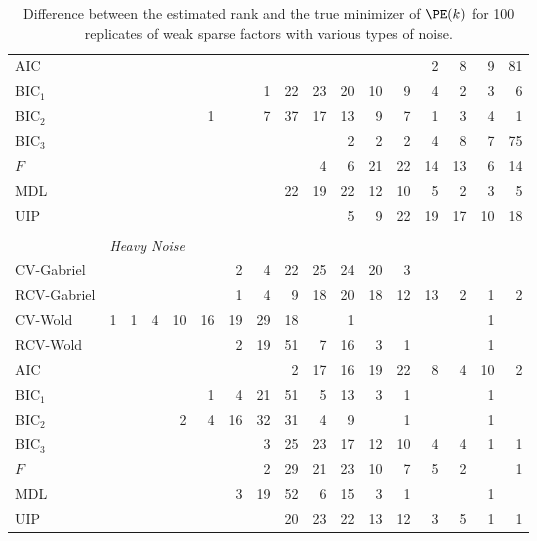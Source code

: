 \begin{table}
\begin{tabular}{lrrrrrrrrrrrrrrrr}
 AIC &  &  &  &  &  &  &  &  &  &  &  &  &  2 &  8 &  9 &  81\\ 
 BIC$_1$ &  &  &  &  &  &  &  1 &  22 &  23 &  20 &  10 &  9 &  4 &  2 &  3 &  6\\ 
 BIC$_2$ &  &  &  &  &  1 &  &  7 &  37 &  17 &  13 &  9 &  7 &  1 &  3 &  4 &  1\\ 
 BIC$_3$ &  &  &  &  &  &  &  &  &  &  2 &  2 &  2 &  4 &  8 &  7 &  75\\ 
 $F$ &  &  &  &  &  &  &  &  &  4 &  6 &  21 &  22 &  14 &  13 &  6 &  14\\ 
 MDL &  &  &  &  &  &  &  &  22 &  19 &  22 &  12 &  10 &  5 &  2 &  3 &  5\\ 
 UIP &  &  &  &  &  &  &  &  &  &  5 &  9 &  22 &  19 &  17 &  10 &  18\\ 
        \\
        &\multicolumn{16}{l}{\scriptsize{\textit{Heavy Noise}}} \\
CV-Gabriel &  &  &  &  &  &  2 &  4 &  22 &  25 &  24 &  20 &  3 &  &  &  & \\ 
 RCV-Gabriel &  &  &  &  &  &  1 &  4 &  9 &  18 &  20 &  18 &  12 &  13 &  2 &  1 &  2\\ 
 CV-Wold &  1 &  1 &  4 &  10 &  16 &  19 &  29 &  18 &  &  1 &  &  &  &  &  1 & \\ 
 RCV-Wold &  &  &  &  &  &  2 &  19 &  51 &  7 &  16 &  3 &  1 &  &  &  1 & \\ 
 AIC &  &  &  &  &  &  &  &  2 &  17 &  16 &  19 &  22 &  8 &  4 &  10 &  2\\ 
 BIC$_1$ &  &  &  &  &  1 &  4 &  21 &  51 &  5 &  13 &  3 &  1 &  &  &  1 & \\ 
 BIC$_2$ &  &  &  &  2 &  4 &  16 &  32 &  31 &  4 &  9 &  &  1 &  &  &  1 & \\ 
 BIC$_3$ &  &  &  &  &  &  &  3 &  25 &  23 &  17 &  12 &  10 &  4 &  4 &  1 &  1\\ 
 $F$ &  &  &  &  &  &  &  2 &  29 &  21 &  23 &  10 &  7 &  5 &  2 &  &  1\\ 
 MDL &  &  &  &  &  &  3 &  19 &  52 &  6 &  15 &  3 &  1 &  &  &  1 & \\ 
 UIP &  &  &  &  &  &  &  &  20 &  23 &  22 &  13 &  12 &  3 &  5 &  1 &  1\\ 
        \bottomrule
    \end{tabular}
    \caption{
        Difference between the estimated rank and the true minimizer of 
        $\PE(k)$ for 100 replicates of weak sparse factors with various
        types of noise.
    }\label{T:rank-est-weak-sparse}
\end{table}

